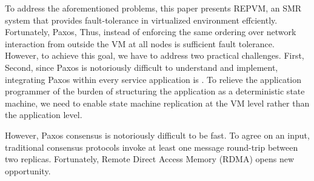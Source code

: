 
To address the aforementioned problems, this paper presents REPVM, an SMR system that provides 
fault-tolerance in virtualized environment effciently.
Fortunately, Paxos, 
Thus, instead of 
enforcing the same ordering over network interaction from outside the VM at all nodes is 
sufficient fault tolerance. However, to achieve this goal, we have to address two practical 
challenges. First, Second, since Paxos is notoriously difficult to understand and implement, 
integrating Paxos within every service application is . To relieve the application programmer 
of the burden of structuring the application as a deterministic state machine, we need to 
enable state machine replication at the VM level rather than the application level.



However, Paxos consensus is notoriously difficult to be fast. 
To agree on an input, traditional consensus protocols invoke at least one 
message round-trip between two replicas. Fortunately, Remote Direct Access Memory (RDMA) opens new opportunity.



